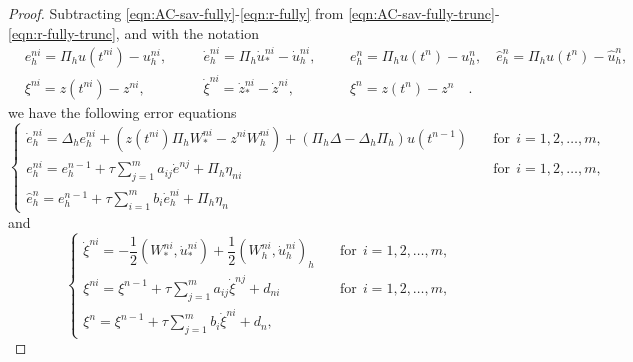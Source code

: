 \documentclass[a4paper, oneside]{book}
\begin{document}
\begin{proof}
Subtracting \eqref{eqn:AC-sav-fully}-\eqref{eqn:r-fully} from \eqref{eqn:AC-sav-fully-trunc}-\eqref{eqn:r-fully-trunc},
and with the notation
\begin{align*}
  &e_h^{ni} = \Pi_h u(t^{ni}) - u_h^{ni},\quad  &&\dot e_h^{ni} = \Pi_h \dot u_*^{ni} - \dot u_h^{ni},
 &&&  e_h^{n} = \Pi_h u(t^n) - u_h^{n},  \quad  \hat e_h^{n} = \Pi_h u(t^n) - \hat u_h^{n},  \\
 & \xi^{ni} = z(t^{ni}) - z^{ni}, \quad  && \dot \xi^{ni} = \dot z_*^{ni} - \dot z^{ni} ,  &&&  \xi^{n} = z(t^n)- z^n\quad  .
\end{align*}
 we have the following error equations
\begin{equation}\label{eqn:AC-sav-fully-err}
    \begin{cases}
   \dot e_h^{ni} =  \Delta_h e_h^{ni} +  (z(t^{ni}) \Pi_h W_*^{ni} - z^{ni} W_h^{ni}) + (\Pi_h \Delta - \Delta_h \Pi_h) u(t^{n-1})
   &\quad \text{for} ~~i=1,2,\dots,m, \\
   e_h^{ni}=  e_h^{n-1}  + \tau \sum_{j=1}^m a_{ij} \dot e^{nj} + \Pi_h \eta_{ni}&\quad \text{for} ~~i=1,2,\dots,m, \\
 \hat e_h^{n} = e_h^{n-1} + \tau \sum_{i=1}^m b_i \dot e_h^{ni} + \Pi_h \eta_{n}
  \end{cases}
\end{equation}
and
\begin{equation}\label{eqn:r-fully-err}
\begin{cases}
    \dot \xi^{ni} = - \dfrac12(W_*^{ni} ,   \dot u_*^{ni}) + \dfrac12(W_h^{ni} ,   \dot u_h^{ni})_h &\quad \text{for} ~~i=1,2,\dots,m, \\
    \xi^{ni} = \xi^{n-1} + \tau \sum_{j=1}^m a_{ij}  \dot \xi^{nj}+ d_{ni}&\quad \text{for} ~~i=1,2,\dots,m, \\
   \xi^n =\xi^{n-1}  +  \tau \sum_{j=1}^m  b_i  \dot \xi^{ni}+d_{n},
 \end{cases}
\end{equation}


\end{proof}
\end{document}
